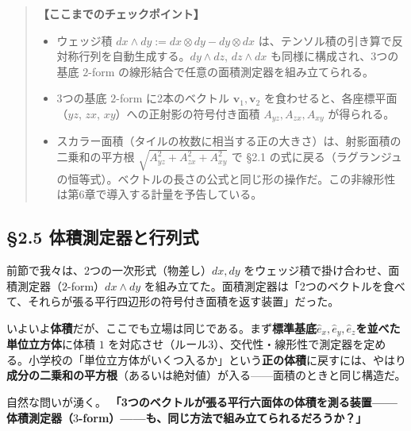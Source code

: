 \documentclass[a4paper,12pt,openany]{book}
\begin{document}
\par\vspace{0.35em}\par

\begin{quote}
\textbf{【ここまでのチェックポイント】}

\begin{itemize}
\item
  ウェッジ積 \(dx \wedge dy := dx \otimes dy - dy \otimes dx\)
  は、テンソル積の引き算で反対称行列を自動生成する。\(dy \wedge dz\),
  \(dz \wedge dx\) も同様に構成され、3つの基底 \(2\)-form
  の線形結合で任意の面積測定器を組み立てられる。
\item
  3つの基底 \(2\)-form に2本のベクトル \(\mathbf{v}_1,\mathbf{v}_2\)
  を食わせると、各座標平面（\(yz\), \(zx\),
  \(xy\)）への正射影の符号付き面積 \(A_{yz},A_{zx},A_{xy}\) が得られる。
\item
  スカラー面積（タイルの枚数に相当する正の大きさ）は、射影面積の二乗和の平方根
  \(\sqrt{A_{yz}^2 + A_{zx}^2 + A_{xy}^2}\) で §2.1
  の式に戻る（ラグランジュの恒等式）。ベクトルの長さの公式と同じ形の操作だ。この非線形性は第6章で導入する計量を予告している。
\end{itemize}
\end{quote}

\par\vspace{0.35em}\par

\hypertarget{ux4f53ux7a4dux6e2cux5b9aux5668ux3068ux884cux5217ux5f0f}{%
\subsection{§2.5
体積測定器と行列式}\label{ux4f53ux7a4dux6e2cux5b9aux5668ux3068ux884cux5217ux5f0f}}

前節で我々は、2つの一次形式（物差し）\(dx, dy\)
をウェッジ積で掛け合わせ、面積測定器（\(2\)-form）\(dx \wedge dy\)
を組み立てた。面積測定器は「2つのベクトルを食べて、それらが張る平行四辺形の符号付き面積を返す装置」だった。

いよいよ\textbf{体積}だが、ここでも立場は同じである。まず\textbf{標準基底}\(\hat{e}_x,\hat{e}_y,\hat{e}_z\)\textbf{を並べた単位立方体}に体積
\(1\)
を対応させ（ルール3）、交代性・線形性で測定器を定める。小学校の「単位立方体がいくつ入るか」という\textbf{正の体積}に戻すには、やはり\textbf{成分の二乗和の平方根}（あるいは絶対値）が入る——面積のときと同じ構造だ。

自然な問いが湧く。
\textbf{「3つのベクトルが張る平行六面体の体積を測る装置——体積測定器（}\(3\)\textbf{-form）——も、同じ方法で組み立てられるだろうか？」}
\end{document}
